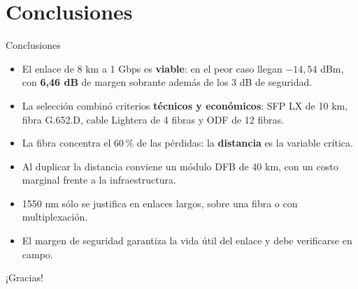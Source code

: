 \documentclass[aspectratio=1610]{beamer}
\begin{document}
\section[Conclusiones]{Conclusiones}
\begin{frame}{Conclusiones}
  \begin{itemize}
    \item El enlace de 8 km a 1 Gbps es \textbf{viable}: en el peor caso llegan $-14{,}54$ dBm, con \textbf{6,46 dB} de margen sobrante además de los 3 dB de seguridad.
    \item La selección combinó criterios \textbf{técnicos y económicos}: SFP LX de 10 km, fibra G.652.D, cable Lightera de 4 fibras y ODF de 12 fibras.
    \item La fibra concentra el 60\,\% de las pérdidas: la \textbf{distancia} es la variable crítica.
    \item Al duplicar la distancia conviene un módulo DFB de 40 km, con un costo marginal frente a la infraestructura.
    \item 1550 nm sólo se justifica en enlaces largos, sobre una fibra o con multiplexación.
    \item El margen de seguridad garantiza la vida útil del enlace y debe verificarse en campo.
  \end{itemize}
\end{frame}

\begin{frame}
  \centering
  \Large ¡Gracias!
\end{frame}
\end{document}
